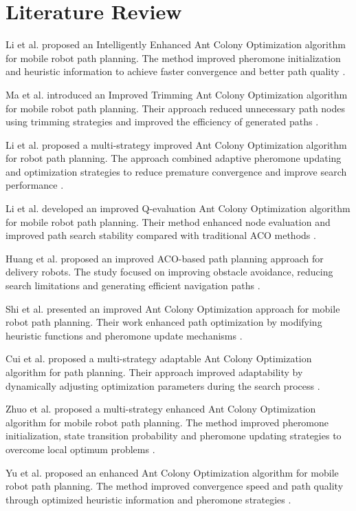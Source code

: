 \documentclass[conference]{IEEEtran}
\begin{document}
\section{Literature Review}

Li et al. proposed an Intelligently Enhanced Ant Colony Optimization algorithm for mobile robot path planning. The method improved pheromone initialization and heuristic information to achieve faster convergence and better path quality \cite{ieaco2025}.

Ma et al. introduced an Improved Trimming Ant Colony Optimization algorithm for mobile robot path planning. Their approach reduced unnecessary path nodes using trimming strategies and improved the efficiency of generated paths \cite{itaco2025}.

Li et al. proposed a multi-strategy improved Ant Colony Optimization algorithm for robot path planning. The approach combined adaptive pheromone updating and optimization strategies to reduce premature convergence and improve search performance \cite{msgaco2025}.

Li et al. developed an improved Q-evaluation Ant Colony Optimization algorithm for mobile robot path planning. Their method enhanced node evaluation and improved path search stability compared with traditional ACO methods \cite{iqaco2025}.

Huang et al. proposed an improved ACO-based path planning approach for delivery robots. The study focused on improving obstacle avoidance, reducing search limitations and generating efficient navigation paths \cite{deliveryaco2025}.

Shi et al. presented an improved Ant Colony Optimization approach for mobile robot path planning. Their work enhanced path optimization by modifying heuristic functions and pheromone update mechanisms \cite{robotaco2025}.

Cui et al. proposed a multi-strategy adaptable Ant Colony Optimization algorithm for path planning. Their approach improved adaptability by dynamically adjusting optimization parameters during the search process \cite{adaptiveaco2025}.

Zhuo et al. proposed a multi-strategy enhanced Ant Colony Optimization algorithm for mobile robot path planning. The method improved pheromone initialization, state transition probability and pheromone updating strategies to overcome local optimum problems \cite{mseaco2026}.

Yu et al. proposed an enhanced Ant Colony Optimization algorithm for mobile robot path planning. The method improved convergence speed and path quality through optimized heuristic information and pheromone strategies \cite{enhancedaco2026}.
\end{document}
